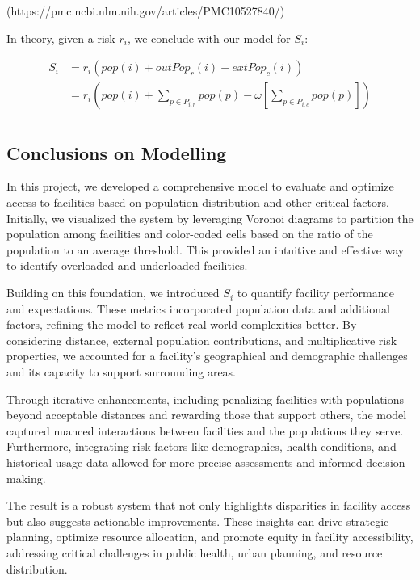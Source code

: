 \documentclass{article}
\begin{document}
(https://pmc.ncbi.nlm.nih.gov/articles/PMC10527840/)

In theory, given a risk $r_i$, we conclude with our model for $S_i$: 

\begin{tcolorbox}[colback=white]
\begin{equation*}
    \begin{split}
        S_i &= r_i \left( pop(i) + outPop_r(i) - extPop_c(i)\right) \\
            &= r_i \left( pop(i) + \sum_{p \in P_{i, r}} pop(p) - \omega\left[\sum_{p \in P_{i, c}} pop(p)\right] \right) \\
    \end{split}
\end{equation*}
\vspace{1.5pt}
\end{tcolorbox}


\subsection{Conclusions on Modelling}
In this project, we developed a comprehensive model to evaluate and optimize access to facilities based on population distribution and other critical factors. Initially, we visualized the system by leveraging Voronoi diagrams to partition the population among facilities and color-coded cells based on the ratio of the population to an average threshold. This provided an intuitive and effective way to identify overloaded and underloaded facilities.

Building on this foundation, we introduced $S_i$ to quantify facility performance and expectations. These metrics incorporated population data and additional factors, refining the model to reflect real-world complexities better. By considering distance, external population contributions, and multiplicative risk properties, we accounted for a facility's geographical and demographic challenges and its capacity to support surrounding areas.

Through iterative enhancements, including penalizing facilities with populations beyond acceptable distances and rewarding those that support others, the model captured nuanced interactions between facilities and the populations they serve. Furthermore, integrating risk factors like demographics, health conditions, and historical usage data allowed for more precise assessments and informed decision-making.

The result is a robust system that not only highlights disparities in facility access but also suggests actionable improvements. These insights can drive strategic planning, optimize resource allocation, and promote equity in facility accessibility, addressing critical challenges in public health, urban planning, and resource distribution.
\end{document}
